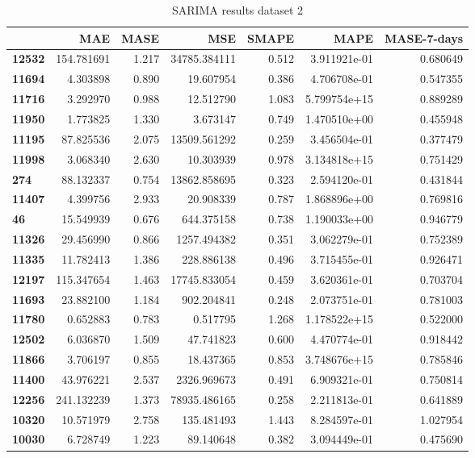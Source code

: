\begin{table}[h]
    \centering
    \caption{SARIMA results dataset 2}
    \label{table:results:SARIMA:dataset2}
    \begin{tabular}{lrrrrrr}
    \toprule
    {} &         MAE &   MASE &           MSE &  SMAPE &          MAPE &  MASE-7-days \\
    \midrule
    \textbf{12532} &  154.781691 &  1.217 &  34785.384111 &  0.512 &  3.911921e-01 &     0.680649 \\
    \textbf{11694} &    4.303898 &  0.890 &     19.607954 &  0.386 &  4.706708e-01 &     0.547355 \\
    \textbf{11716} &    3.292970 &  0.988 &     12.512790 &  1.083 &  5.799754e+15 &     0.889289 \\
    \textbf{11950} &    1.773825 &  1.330 &      3.673147 &  0.749 &  1.470510e+00 &     0.455948 \\
    \textbf{11195} &   87.825536 &  2.075 &  13509.561292 &  0.259 &  3.456504e-01 &     0.377479 \\
    \textbf{11998} &    3.068340 &  2.630 &     10.303939 &  0.978 &  3.134818e+15 &     0.751429 \\
    \textbf{274  } &   88.132337 &  0.754 &  13862.858695 &  0.323 &  2.594120e-01 &     0.431844 \\
    \textbf{11407} &    4.399756 &  2.933 &     20.908339 &  0.787 &  1.868896e+00 &     0.769816 \\
    \textbf{46   } &   15.549939 &  0.676 &    644.375158 &  0.738 &  1.190033e+00 &     0.946779 \\
    \textbf{11326} &   29.456990 &  0.866 &   1257.494382 &  0.351 &  3.062279e-01 &     0.752389 \\
    \textbf{11335} &   11.782413 &  1.386 &    228.886138 &  0.496 &  3.715455e-01 &     0.926471 \\
    \textbf{12197} &  115.347654 &  1.463 &  17745.833054 &  0.459 &  3.620361e-01 &     0.703704 \\
    \textbf{11693} &   23.882100 &  1.184 &    902.204841 &  0.248 &  2.073751e-01 &     0.781003 \\
    \textbf{11780} &    0.652883 &  0.783 &      0.517795 &  1.268 &  1.178522e+15 &     0.522000 \\
    \textbf{12502} &    6.036870 &  1.509 &     47.741823 &  0.600 &  4.470774e-01 &     0.918442 \\
    \textbf{11866} &    3.706197 &  0.855 &     18.437365 &  0.853 &  3.748676e+15 &     0.785846 \\
    \textbf{11400} &   43.976221 &  2.537 &   2326.969673 &  0.491 &  6.909321e-01 &     0.750814 \\
    \textbf{12256} &  241.132239 &  1.373 &  78935.486165 &  0.258 &  2.211813e-01 &     0.641889 \\
    \textbf{10320} &   10.571979 &  2.758 &    135.481493 &  1.443 &  8.284597e-01 &     1.027954 \\
    \textbf{10030} &    6.728749 &  1.223 &     89.140648 &  0.382 &  3.094449e-01 &     0.475690 \\
    \bottomrule
    \end{tabular}
\end{table}
